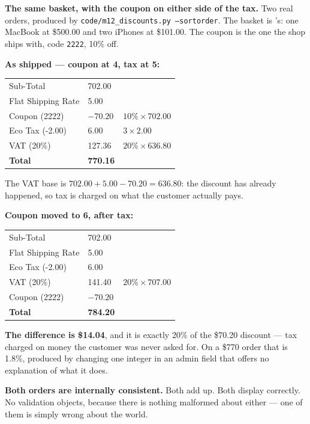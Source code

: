 \begin{worked}
\textbf{The same basket, with the coupon on either side of the tax.} Two real
orders, produced by \texttt{code/m12\_discounts.py --sortorder}. The basket is
's: one MacBook at \$500.00 and two iPhones at \$101.00. The
coupon is the one the shop ships with, code \texttt{2222}, 10\% off.

\smallskip
\textbf{As shipped --- coupon at 4, tax at 5:}

\smallskip
\begin{tabular}{@{}L{6.4cm}L{3.4cm}L{4.2cm}@{}}
Sub-Total & 702.00 & \\
Flat Shipping Rate & 5.00 & \\
Coupon (2222) & $-70.20$ & $10\% \times 702.00$ \\
Eco Tax (-2.00) & 6.00 & $3 \times 2.00$ \\
VAT (20\%) & 127.36 & $20\% \times 636.80$ \\
\textbf{Total} & \textbf{770.16} & \\
\end{tabular}

\smallskip
The VAT base is $702.00 + 5.00 - 70.20 = 636.80$: the discount has already
happened, so tax is charged on what the customer actually pays.

\smallskip
\textbf{Coupon moved to 6, after tax:}

\smallskip
\begin{tabular}{@{}L{6.4cm}L{3.4cm}L{4.2cm}@{}}
Sub-Total & 702.00 & \\
Flat Shipping Rate & 5.00 & \\
Eco Tax (-2.00) & 6.00 & \\
VAT (20\%) & 141.40 & $20\% \times 707.00$ \\
Coupon (2222) & $-70.20$ & \\
\textbf{Total} & \textbf{784.20} & \\
\end{tabular}

\smallskip
\textbf{The difference is \$14.04}, and it is exactly 20\% of the \$70.20
discount --- tax charged on money the customer was never asked for. On a \$770
order that is 1.8\%, produced by changing one integer in an admin field that
offers no explanation of what it does.

\smallskip
\textbf{Both orders are internally consistent.} Both add up. Both display
correctly. No validation objects, because there is nothing malformed about
either --- one of them is simply wrong about the world.
\end{worked}


